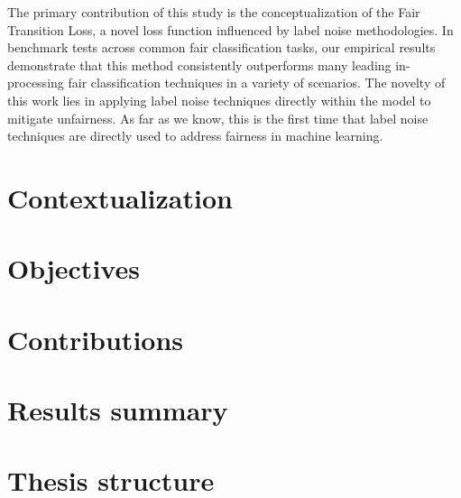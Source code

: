 The primary contribution of this study is the conceptualization of the Fair Transition Loss, a novel loss function influenced by label noise methodologies. In benchmark tests across common fair classification tasks, our empirical results demonstrate that this method consistently outperforms many leading in-processing fair classification techniques in a variety of scenarios. The novelty of this work lies in applying label noise techniques directly within the model to mitigate unfairness. As far as we know, this is the first time that label noise techniques are directly used to address fairness in machine learning.



\section{Contextualization}

\section{Objectives}

\section{Contributions}

\section{Results summary}

\section{Thesis structure}
